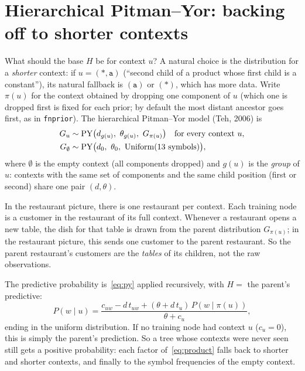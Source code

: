 \documentclass[11pt]{article}
\newcommand{\PY}{\mathrm{PY}}
\newcommand{\Unif}{\mathrm{Uniform}}
\begin{document}
\section{Hierarchical Pitman--Yor: backing off to shorter contexts}\label{sec:hpy}

What should the base $H$ be for context $u$? A natural choice is the distribution for a \emph{shorter}
context: if $u = (\texttt{*}, \texttt{a})$ (``second child of a product whose first child is a
constant''), its natural fallback is $(\texttt{a})$ or $(\texttt{*})$, which has more data. Write
$\pi(u)$ for the context obtained by dropping one component of $u$ (which one is dropped first is
fixed for each prior; by default the most distant ancestor goes first, as in \texttt{fnprior}). The
hierarchical Pitman--Yor model (Teh, 2006) is
\begin{align}
  G_u &\sim \PY\big(d_{g(u)},\ \theta_{g(u)},\ G_{\pi(u)}\big) \quad \text{for every context } u, \label{eq:hpy}\\
  G_{\emptyset} &\sim \PY\big(d_{0},\ \theta_{0},\ \Unif(13 \text{ symbols})\big), \notag
\end{align}
where $\emptyset$ is the empty context (all components dropped) and $g(u)$ is the \emph{group} of $u$:
contexts with the same set of components and the same child position (first or second) share one pair
$(d, \theta)$.

In the restaurant picture, there is one restaurant per context. Each training node is a customer in the
restaurant of its full context. Whenever a restaurant opens a new table, the dish for that table is drawn
from the parent distribution $G_{\pi(u)}$; in the restaurant picture, this sends one customer to the
parent restaurant. So the parent restaurant's customers are the \emph{tables} of its children, not the
raw observations.

The predictive probability is~\eqref{eq:py} applied recursively, with $H = $ the parent's predictive:
\begin{equation}\label{eq:hpy-pred}
  P(w \mid u) = \frac{c_{uw} - d\, t_{uw} + (\theta + d\, t_{u})\, P(w \mid \pi(u))}{\theta + c_u},
\end{equation}
ending in the uniform distribution. If no training node had context $u$ ($c_u=0$), this is simply the
parent's prediction. So a tree whose contexts were never seen still gets a positive probability: each
factor of~\eqref{eq:product} falls back to shorter and shorter contexts, and finally to the symbol
frequencies of the empty context.
\end{document}
